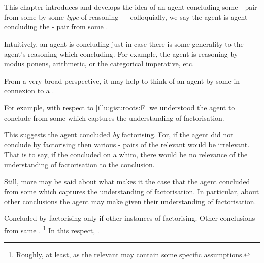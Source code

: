 \chapter{}
\label{cha:typical}

\nocite{Wilson:1994aa}
\nocite{Goodman:1983aa}

\begin{note}
  This chapter introduces and develops the idea of an agent concluding some - pair from some \pool{} by some \emph{type} of reasoning --- colloquially, we say the agent is agent \emph{\typeAdj{}} concluding the - pair from some \pool{}.

  Intuitively, an agent is \typeAdj{} concluding just in case there is some generality to the agent's reasoning which concluding.
  For example, the agent is reasoning by modus ponens, arithmetic, or the categorical imperative, etc.
\end{note}


\begin{note}
  From a very broad perspective, it may help to think of an agent by some \torN{} in connexion to a \pool{}.

  For example, with respect to \autoref{illu:gist:roots:F} we understood the agent to conclude  from some \pool{} which captures the \agents{} understanding of factorisation.

  This suggests the agent concluded  \emph{by} factorising.
  For, if the agent did not conclude  by factorising then various - pairs of the relevant \pool{} would be irrelevant.
  That is to say, if the concluded  on a whim, there would be no relevance of the \agents{} understanding of factorisation to the conclusion.

  Still, more may be said about what makes it the case that the agent concluded  from some \pool{} which captures the \agents{} understanding of factorisation.
  In particular, about other conclusions the agent may make given their understanding of factorisation.

  Concluded by factorising only if other instances of factorising.
  Other conclusions from same \pool{}.%
  \footnote{
    Roughly, at least, as the relevant \pool{} may contain some specific assumptions.
  }
  In this respect, .
\end{note}


